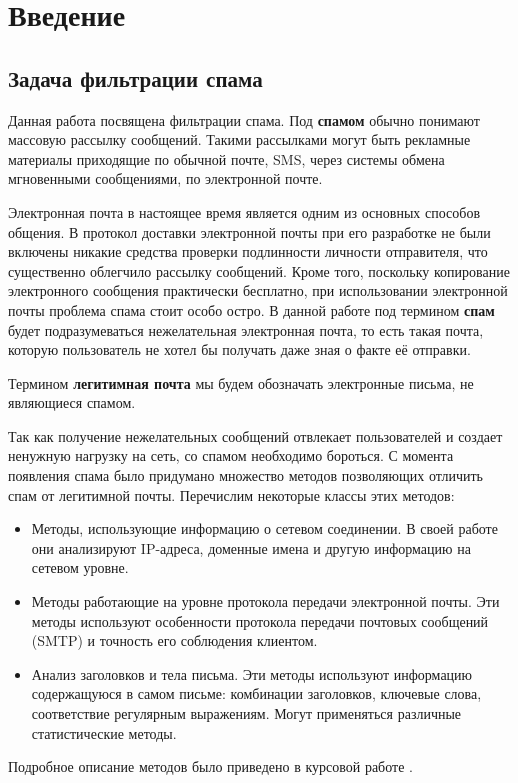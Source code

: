 \newpage
\section{Введение}



\subsection{Задача фильтрации спама}
Данная работа посвящена фильтрации спама. Под \textbf{спамом} обычно понимают массовую рассылку сообщений. Такими рассылками могут быть рекламные материалы приходящие по обычной почте, SMS,  через системы обмена мгновенными сообщениями, по электронной почте.

Электронная почта в настоящее время является одним из основных способов общения. В протокол доставки электронной почты \cite{RFC2081} при его разработке не были включены никакие средства проверки подлинности личности отправителя, что существенно облегчило рассылку  сообщений. Кроме того, поскольку копирование электронного сообщения практически бесплатно, при использовании электронной почты проблема спама стоит особо остро. В данной работе под термином \textbf{спам} будет подразумеваться нежелательная электронная почта, то есть такая почта, которую пользователь не хотел бы получать даже зная о факте её отправки.

Термином \textbf{легитимная почта} мы будем обозначать электронные письма, не являющиеся спамом.

Так как получение нежелательных сообщений  отвлекает пользователей и создает ненужную нагрузку на сеть, со спамом необходимо бороться. С момента появления спама было придумано множество методов позволяющих отличить спам от легитимной почты. Перечислим некоторые классы этих методов:
\begin{itemize}
\item Методы, использующие информацию о сетевом соединении. В своей работе они анализируют IP-адреса, доменные имена и другую информацию на сетевом уровне.
\item Методы работающие на уровне протокола передачи электронной почты. Эти методы используют особенности протокола передачи почтовых сообщений (SMTP)  и точность его соблюдения клиентом.
\item Анализ заголовков и тела письма. Эти методы используют информацию содержащуюся в самом письме: комбинации заголовков, ключевые слова, соответствие регулярным выражениям. Могут применяться различные статистические методы.
\end{itemize}
Подробное описание методов было приведено в курсовой работе \cite{PETROV10}. 

